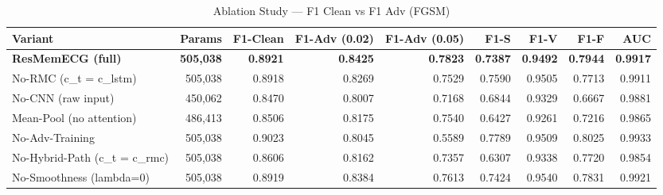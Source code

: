 \begin{table}[h]
\centering
\caption{Ablation Study --- F1 Clean vs F1 Adv (FGSM)}
\label{tab:ablation_final}
\begin{tabular}{lrrrrrrrr}
\toprule
Variant & Params & F1-Clean & F1-Adv (0.02) & F1-Adv (0.05) & F1-S & F1-V & F1-F & AUC \\
\midrule
\textbf{ResMemECG (full)} & \textbf{505,038} & \textbf{0.8921} & \textbf{0.8425} & \textbf{0.7823} & \textbf{0.7387} & \textbf{0.9492} & \textbf{0.7944} & \textbf{0.9917} \\
No-RMC (c_t = c_lstm) & 505,038 & 0.8918 & 0.8269 & 0.7529 & 0.7590 & 0.9505 & 0.7713 & 0.9911 \\
No-CNN (raw input) & 450,062 & 0.8470 & 0.8007 & 0.7168 & 0.6844 & 0.9329 & 0.6667 & 0.9881 \\
Mean-Pool (no attention) & 486,413 & 0.8506 & 0.8175 & 0.7540 & 0.6427 & 0.9261 & 0.7216 & 0.9865 \\
No-Adv-Training & 505,038 & 0.9023 & 0.8045 & 0.5589 & 0.7789 & 0.9509 & 0.8025 & 0.9933 \\
No-Hybrid-Path (c_t = c_rmc) & 505,038 & 0.8606 & 0.8162 & 0.7357 & 0.6307 & 0.9338 & 0.7720 & 0.9854 \\
No-Smoothness (lambda=0) & 505,038 & 0.8919 & 0.8384 & 0.7613 & 0.7424 & 0.9540 & 0.7831 & 0.9921 \\
\bottomrule
\end{tabular}
\end{table}
